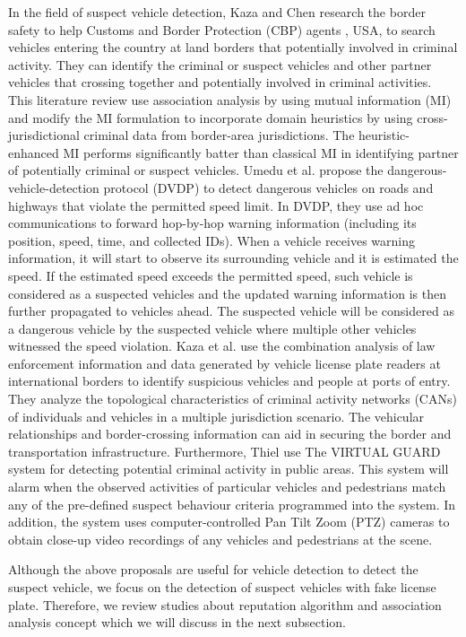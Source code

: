 \documentclass{llncs}
\begin{document}
In the field of suspect vehicle detection, Kaza and Chen \cite{kaza:suspectVehicle} research the border safety to help Customs and Border Protection (CBP) agents , USA, to search vehicles entering the country at land borders that potentially involved in criminal activity.
They can identify the criminal or suspect vehicles and other partner vehicles that crossing together and potentially involved in criminal activities. This literature review use association analysis by using mutual information (MI) and modify the MI formulation to incorporate domain heuristics by using cross-jurisdictional criminal data from border-area jurisdictions.
The heuristic-enhanced MI performs significantly batter than classical MI \cite{kaza} in identifying partner of potentially criminal or suspect vehicles.
%
Umedu et al. \cite{Umedu} propose the dangerous-vehicle-detection protocol (DVDP) to detect dangerous vehicles on roads and highways that violate the permitted speed limit.
In DVDP, they use ad hoc communications to forward hop-by-hop warning information (including its position, speed, time, and collected IDs). 
When a vehicle receives warning information, it will start to observe its surrounding vehicle and it is estimated the speed. 
If the estimated speed exceeds the permitted speed, such vehicle is considered as a suspected vehicles and the updated warning information is then further propagated to vehicles ahead. 
The suspected vehicle will be considered as a dangerous vehicle by the suspected vehicle where multiple other vehicles witnessed the speed violation.
%
Kaza et al. \cite{kaza:TopologicalAnalysis} use the combination analysis of law enforcement information and data generated by vehicle license plate readers at international borders to identify suspicious vehicles and people at ports of entry.
They analyze the topological characteristics of criminal activity networks (CANs) of individuals and vehicles in a multiple jurisdiction scenario. 
The vehicular relationships and border-crossing information can aid in securing the border and transportation infrastructure. 
%
Furthermore, Thiel \cite{Thiel} use The VIRTUAL GUARD system for detecting potential criminal activity in public areas. 
This system will alarm when the observed activities of particular vehicles and pedestrians match any of the pre-defined suspect behaviour criteria programmed into the system. 
In addition, the system uses computer-controlled Pan Tilt Zoom (PTZ) cameras to obtain close-up video recordings of any vehicles and pedestrians at the scene.

Although the above proposals are useful for vehicle detection to detect the suspect vehicle, we focus on the detection of suspect vehicles with fake license plate. 
Therefore, we review studies about reputation algorithm and association analysis concept which we will discuss in the next subsection.
\end{document}
